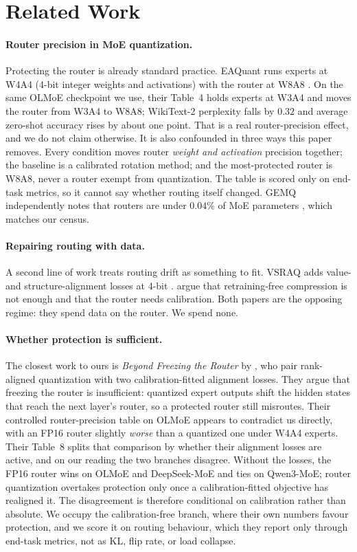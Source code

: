 \documentclass[11pt]{article}
\begin{document}
\section{Related Work}
\label{sec:related}

\paragraph{Router precision in MoE quantization.}
Protecting the router is already standard practice. EAQuant runs experts at
W4A4 (4-bit integer weights and activations) with the router at W8A8 \citep{fu2025eaquant}. On the same OLMoE
checkpoint we use, their Table~4 holds experts at W3A4 and moves the router
from W3A4 to W8A8; WikiText-2 perplexity falls by $0.32$ and average
zero-shot accuracy rises by about one point. That is a real router-precision
effect, and we do not claim otherwise. It is also confounded in three ways
this paper removes. Every condition moves router \emph{weight and
activation} precision together; the baseline is a calibrated rotation
method; and the most-protected router is W8A8, never a router exempt from
quantization. The table is scored only on end-task metrics, so it cannot
say whether routing itself changed. GEMQ independently notes that routers
are under $0.04\%$ of MoE parameters \citep{deng2026gemq}, which matches
our census.

\paragraph{Repairing routing with data.}
A second line of work treats routing drift as something to fit. VSRAQ adds
value- and structure-alignment losses at 4-bit
\citep{park2026vsraq}. \citet{hyeon2026retrainingfree} argue that
retraining-free compression is not enough and that the router needs
calibration. Both papers are the opposing regime: they spend data on the
router. We spend none.

\paragraph{Whether protection is sufficient.}
The closest work to ours is \emph{Beyond Freezing the Router} by
\citet{routequant2026}, who pair rank-aligned quantization with two
calibration-fitted alignment losses. They argue that freezing the router is
insufficient: quantized expert outputs shift the hidden states
that reach the next layer's router, so a protected router still
misroutes. Their controlled router-precision table on OLMoE
appears to contradict us directly, with an FP16 router slightly
\emph{worse} than a quantized one under W4A4 experts. Their
Table~8 splits that comparison by whether their alignment losses
are active, and on our reading the two branches disagree. Without
the losses, the FP16 router wins on OLMoE and DeepSeek-MoE and
ties on Qwen3-MoE; router quantization overtakes protection only
once a calibration-fitted objective has realigned it. The
disagreement is therefore conditional on calibration rather than
absolute. We occupy the calibration-free branch, where their own
numbers favour protection, and we score it on routing behaviour,
which they report only through end-task metrics, not as KL, flip
rate, or load collapse.
\end{document}
